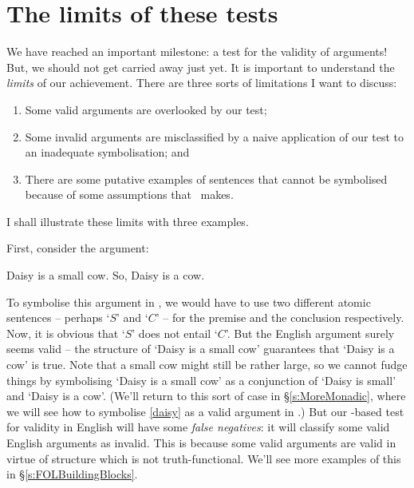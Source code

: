 \section{The limits of these tests}\label{s:ParadoxesOfMaterialConditional}
We have reached an important milestone: a test for the validity of arguments! But, we should not get carried away just yet. It is important to understand the \emph{limits} of our achievement. There are three sorts of limitations I want to discuss: \begin{enumerate}
	\item Some valid arguments are overlooked by our test;
	\item Some invalid arguments are misclassified by a naive application of our test to an inadequate symbolisation; and
	\item There are some putative examples of sentences that cannot be symbolised because of some assumptions that \TFL\ makes.
\end{enumerate}
I shall illustrate these limits with three examples.

First, consider the argument: 
	\begin{earg}
		\item[\ex{daisy}] Daisy is a small cow. So, Daisy is a cow.
	\end{earg}
To symbolise this argument in \TFL, we would have to use two different atomic sentences – perhaps `$S$'  and `$C$' – for the premise and the conclusion respectively. Now, it is obvious that `$S$' does not entail `$C$'. But the English argument surely seems valid – the structure of `Daisy is a small cow' guarantees that `Daisy is a cow' is true. Note that a small cow might still be rather large, so we cannot fudge things by symbolising `Daisy is a small cow' as a conjunction of `Daisy is small' and `Daisy is a cow'. (We'll return to this sort of case in §\ref{s:MoreMonadic}, where we will see how to symbolise \ref{daisy} as a valid argument in \FOL.) But our \TFL-based test for validity in English will have some \emph{false negatives}: it will classify some valid English arguments as invalid. This is because some valid arguments are valid in virtue of structure which is not truth-functional. We'll see more examples of this in §\ref{s:FOLBuildingBlocks}. 

